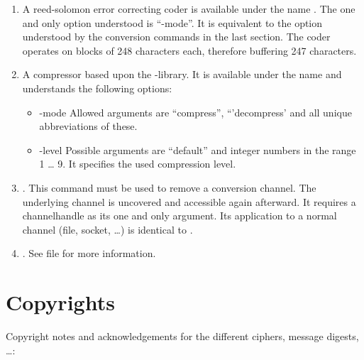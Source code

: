 \documentclass {report}
\begin{document}
\begin	{enumerate}
\item	A reed-solomon error correcting coder is available under the
	name . The one and only option understood is
	``-mode''. It is equivalent to the option understood by the
	conversion commands in the last section. The coder operates on
	blocks of 248 characters each, therefore buffering 247
	characters.

\item	A compressor based upon the \zlib{}-library. It is
	available under the name  and understands the
	following options:

	\begin	{itemize}
	\item[-mode]	Allowed arguments are ``compress'',
			``'decompress' and all unique abbreviations of
			these.
	\item[-level]	Possible arguments are ``default'' and integer
			numbers in the range 1 \dots{} 9. It specifies
			the used compression level.
	\end	{itemize}

\item	{}. This command must be used to remove a
	conversion channel. The underlying channel is uncovered and
	accessible again afterward. It requires a channelhandle as its
	one and only argument. Its application to a normal channel
	(file, socket, \dots {}) is identical to .

\item	{}. See file 
	for more information.
\end	{enumerate}

\chapter {Copyrights}\label {copyright}

Copyright notes and acknowledgements for the different ciphers,
message digests, \dots {}:
\end{document}
